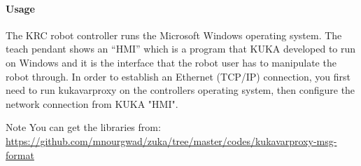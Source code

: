 \paragraph{Usage}
The KRC robot controller runs the Microsoft Windows operating system. The teach pendant shows an “HMI” which is a program that KUKA developed to run on Windows and it is the interface that the robot user has to manipulate the robot through. In order to establish an Ethernet (TCP/IP) connection, you first need to run kukavarproxy on the controllers operating system, then configure the network connection from KUKA "HMI".
 \begin{mynotebox}{Note}
   You can get the libraries from:\\
   \url{https://github.com/mnourgwad/zuka/tree/master/codes/kukavarproxy-msg-format}
\end{mynotebox}

